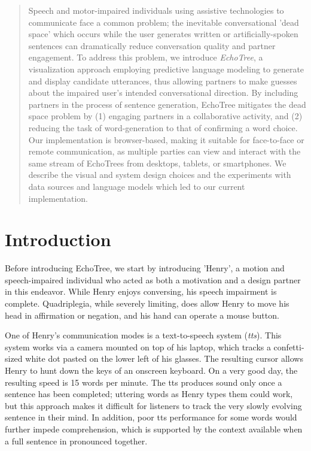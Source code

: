 \documentclass{sigchi}
\begin{document}
\begin{abstract}
Speech and motor-impaired individuals using assistive technologies to communicate face a common problem; the inevitable conversational 'dead space' which occurs while the user generates written or artificially-spoken sentences can dramatically reduce conversation quality and partner engagement. To address this problem, we introduce {\em EchoTree}, a visualization approach employing predictive language modeling to generate and display candidate utterances, thus allowing  partners to make guesses about the impaired user's intended conversational direction. By including partners in the process of sentence generation, EchoTree mitigates the dead space problem by (1) engaging partners in a collaborative activity, and (2) reducing the task of word-generation to that of confirming a word choice. Our implementation is browser-based, making it suitable for face-to-face or remote communication, as multiple parties can view and interact with the same stream of EchoTrees from desktops, tablets, or smartphones. We describe the visual and system design choices and the experiments with data sources and language models which led to our current implementation.
\end{abstract}







\section{Introduction}
Before introducing EchoTree, we start by introducing 'Henry', a motion and speech-impaired individual who acted as both a motivation and a design partner in this endeavor. While Henry enjoys conversing, his speech impairment is complete. Quadriplegia, while severely limiting, does allow Henry to move his head in affirmation or negation, and his hand can operate a mouse button. 

One of Henry’s communication modes is a text-to-speech system ({\em tts}). This system works via a camera mounted on top of his laptop, which tracks a confetti-sized white dot pasted on the lower left of his glasses. The resulting cursor allows Henry to hunt down the keys of an onscreen keyboard. On a very good day, the resulting speed is 15 words per minute.
The tts produces sound only once a sentence has been completed; uttering words as Henry types them could work, but this approach makes it difficult for listeners to track the very slowly evolving sentence in their mind. In addition, poor tts performance for some words would further impede comprehension, which is supported by the context available when a full sentence in pronounced together.
\end{document}
